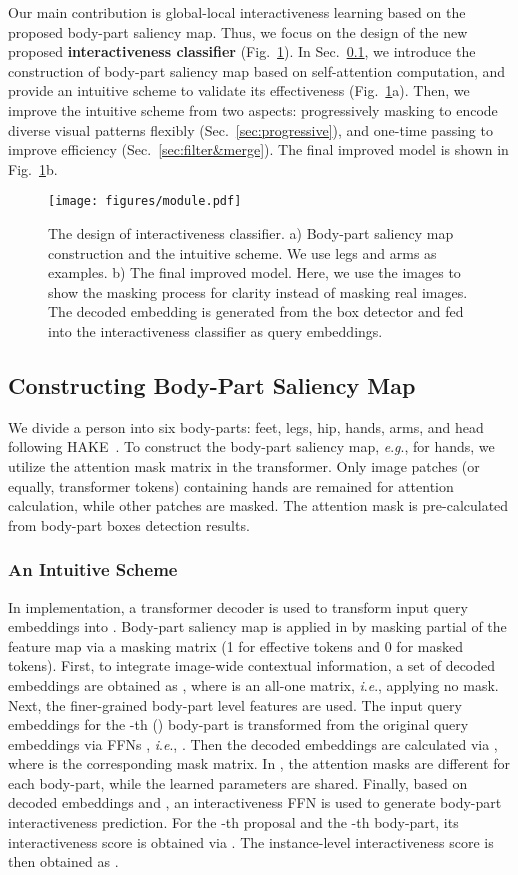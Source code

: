 \documentclass[runningheads]{llncs}
\newcommand{\ie}{\textit{i}.\textit{e}.}
\newcommand{\eg}{\textit{e}.\textit{g}.}
\begin{document}
Our main contribution is global-local interactiveness learning based on the proposed body-part saliency map. Thus, we focus on the design of the new proposed \textbf{interactiveness classifier} (Fig.~\ref{fig:module}).
In Sec.~\ref{sec:intuitive}, we introduce the construction of body-part saliency map based on self-attention computation, and provide an intuitive scheme to validate its effectiveness (Fig.~\ref{fig:module}a).
Then, we improve the intuitive scheme from two aspects: progressively masking to encode diverse visual patterns flexibly (Sec.~\ref{sec:progressive}), and one-time passing to improve efficiency (Sec.~\ref{sec:filter&merge}). The final improved model is shown in Fig.~\ref{fig:module}b.

\begin{figure}
\centering
\texttt{[image: figures/module.pdf]}
\caption{The design of interactiveness classifier. 
a) Body-part saliency map construction and the intuitive scheme. We use legs and arms as examples.
b) The final improved model.
Here, we use the images to show the masking process for clarity instead of masking real images. The decoded embedding  is generated from the box detector and fed into the interactiveness classifier as query embeddings.
}
\label{fig:module}
\end{figure}

\subsection{Constructing Body-Part Saliency Map}
\label{sec:intuitive}
We divide a person into six body-parts: feet, legs, hip, hands, arms, and head following HAKE~\cite{li2019hake}. To construct the body-part saliency map, \eg, for hands, we utilize the attention mask matrix in the transformer. Only image patches (or equally, transformer tokens) containing hands are remained for attention calculation, while other patches are masked. 
The attention mask is pre-calculated from body-part boxes detection results.

\subsubsection{An Intuitive Scheme}
In implementation, a transformer decoder  is used to transform input query embeddings  into . Body-part saliency map is applied in  by masking partial of the feature map  via a masking matrix  (1 for effective tokens and 0 for masked tokens). 
First, to integrate image-wide contextual information, a set of decoded embeddings are obtained as , where  is an all-one matrix, \ie, applying no mask. 
Next, the finer-grained body-part level features are used. The input query embeddings  for the -th () body-part is transformed from the original query embeddings  via FFNs , \ie, . Then the decoded embeddings are calculated via , where  is the corresponding mask matrix. In , the attention masks are different for each body-part, while the learned parameters are shared.
Finally, based on decoded embeddings  and , an interactiveness FFN  is used to generate body-part interactiveness prediction. For the -th proposal and the -th body-part, its interactiveness score is obtained via . The instance-level interactiveness score is then obtained as . 
\end{document}
